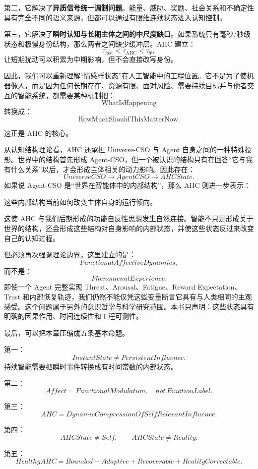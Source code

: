 第二，它解决了\textbf{异质信号统一调制问题}。能量、威胁、奖励、社会关系和不确定性具有完全不同的语义来源，但都可以通过有限维连续状态进入认知控制。

第三，它解决了\textbf{瞬时认知与长期主体之间的中尺度缺口}。如果系统只有毫秒/秒级状态和极慢身份结构，那么两者之间缺少缓冲层。AHC 建立：
\[
\tau_{\mathrm{fast}}
<
\tau_{\mathrm{AHC}}
<
\tau_{\Psi},
\]
让短期扰动可以积累为中期影响，但不会直接改写身份。

因此，我们可以重新理解“情感样状态”在人工智能中的工程位置。它不是为了使机器像人，而是因为任何长期存在、资源有限、面对风险、需要持续目标并与他者交互的智能系统，都需要某种机制把：
\[
\text{WhatIsHappening}
\]
转换成：
\[
\text{HowMuchShouldThisMatterNow}.
\]

这正是 AHC 的核心。

从认知结构理论看，AHC 还承担 Universe-CSO 与 Agent 自身之间的一种特殊投影。世界中的结构首先形成 Agent-CSO，但一个被认识的结构只有在回答“它与我有什么关系”以后，才会形成主体相关的动力影响。因此存在：
\[
UniverseCSO
\rightarrow
AgentCSO
\rightarrow
AHCState.
\]
如果说 Agent-CSO 是“世界在智能体中的内部结构”，那么 AHC 则进一步表示：
\begin{statementbox}
这些内部结构当前如何改变主体自身的运行倾向。
\end{statementbox}

这使 AHC 与我们后期形成的功能自反性思想发生自然连接。智能不只是形成关于世界的结构，还会形成这些结构对自身影响的内部状态，并使这些状态反过来改变自己的认知过程。

但必须再次强调理论边界。这里建立的是：
\[
FunctionalAffectiveDynamics,
\]
而不是：
\[
PhenomenalExperience.
\]
即使一个 Agent 完整实现 Threat、Arousal、Fatigue、Reward Expectation、Trust 和内部恢复轨迹，我们仍然不能仅凭这些变量断言它具有与人类相同的主观感受。这个问题属于另外的意识哲学与科学研究范围。本书只声明：这些状态具有明确的因果作用、时间连续性和工程可测性。

最后，可以把本章压缩成五条基本命题。

第一：
\[
\boxed{
InstantState
\neq
PersistentInfluence.
}
\]
持续智能需要把瞬时事件转换成有时间常数的内部状态。

第二：
\[
\boxed{
Affect
=
FunctionalModulation,
\quad
not\,
EmotionLabel.
}
\]

第三：
\[
\boxed{
AHC
=
DynamicCompressionOfSelfRelevantInfluence.
}
\]

第四：
\[
\boxed{
AHCState
\neq
Self,
\qquad
AHCState
\neq
Reality.
}
\]

第五：
\[
\boxed{
HealthyAHC
=
Bounded
+
Adaptive
+
Recoverable
+
RealityCorrectable.
}
\]


